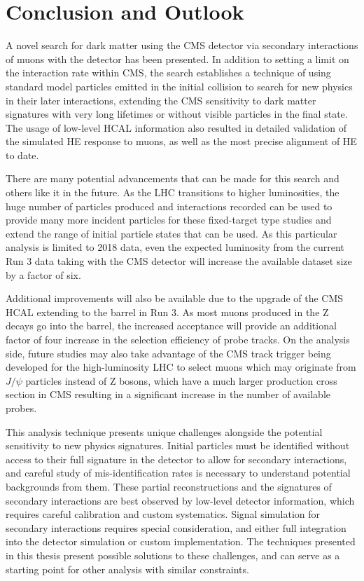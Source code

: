 \chapter{Conclusion and Outlook}
\label{conclusion_chapter}

A novel search for dark matter using the CMS detector via secondary interactions of muons with the detector has been presented.
In addition to setting a limit on the \dbrem interaction rate within CMS, the search establishes a technique of using standard model particles emitted in the initial collision to search for new physics in their later interactions, extending the CMS sensitivity to dark matter signatures with very long lifetimes or without visible particles in the final state.
The usage of low-level HCAL information also resulted in detailed validation of the simulated HE response to muons, as well as the most precise alignment of HE to date.

There are many potential advancements that can be made for this search and others like it in the future. 
As the LHC transitions to higher luminosities, the huge number of particles produced and interactions recorded can be used to provide many more incident particles for these fixed-target type studies and extend the range of initial particle states that can be used.
As this particular analysis is limited to 2018 data, even the expected luminosity from the current Run 3 data taking with the CMS detector will increase the available dataset size by a factor of six.

Additional improvements will also be available due to the upgrade of the CMS HCAL extending to the barrel in Run 3. 
As most muons produced in the Z decays go into the barrel, the increased acceptance will provide an additional factor of four increase in the selection efficiency of probe tracks.
On the analysis side, future studies may also take advantage of the CMS track trigger being developed for the high-luminosity LHC to select muons which may originate from $J/\psi$ particles instead of Z bosons, which have a much larger production cross section in CMS resulting in a significant increase in the number of available probes.

This analysis technique presents unique challenges alongside the potential sensitivity to new physics signatures. 
Initial particles must be identified without access to their full signature in the detector to allow for secondary interactions, and careful study of mis-identification rates is necessary to understand potential backgrounds from them.
These partial reconstructions and the signatures of secondary interactions are best observed by low-level detector information, which requires careful calibration and custom systematics.
Signal simulation for secondary interactions requires special consideration, and either full integration into the detector simulation or custom implementation.
The techniques presented in this thesis present possible solutions to these challenges, and can serve as a starting point for other analysis with similar constraints.

